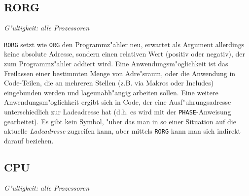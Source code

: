 \documentclass[12pt,a4paper,twoside]{report}
\makeatletter
\newcommand{\tty}[1]{{\tt #1}}
\newcommand{\ttindex}[1]{\index{#1@{\tt #1}}}
\makeatother
\begin{document}
\subsection{RORG}
\label{SectRORG}
\ttindex{RORG}

{\em G"ultigkeit: alle Prozessoren}

\tty{RORG} setzt wie \tty{ORG} den Programmz"ahler neu, erwartet
als Argument allerdings keine absolute Adresse, sondern einen
relativen Wert (positiv oder negativ), der zum Programmz"ahler
addiert wird.  Eine Anwendungsm"oglichkeit ist das Freilassen
einer bestimmten Menge von Adre"sraum, oder die Anwendung in
Code-Teilen, die an mehreren Stellen (z.B. via Makros oder
Includes) eingebunden werden und lageunabh"angig arbeiten sollen.
Eine weitere Anwendungsm"oglichkeit ergibt sich in Code, der eine
Ausf"uhrungsadresse unterschiedlich zur Ladeadresse hat (d.h. es
wird mit der \tty{PHASE}-Anweisung gearbeitet).  Es gibt kein
Symbol, "uber das man in so einer Situation auf die aktuelle
{\em Ladeadresse} zugreifen kann, aber mittels \tty{RORG} kann man
sich indirekt darauf beziehen.


\subsection{CPU}
\label{SectCPU}
\ttindex{CPU}


\newcommand{\cpu}{
 \stepcounter{cpucounter1}
 \ifnum\value{cpucounter1}>26
   \setcounter{cpucounter1}{1}
   \stepcounter{cpucounter2}
 \fi
 \ifnum\value{cpucounter2}>0\alph{cpucounter2}\fi\alph{cpucounter1})
}
\newenvironment{cpulist}
{
 \begin{quote}
 \begin{tabbing}
 \cpu \=
 }
{
 \end{tabbing}
 \end{quote}
}

{\em G"ultigkeit: alle Prozessoren}
\end{document}
